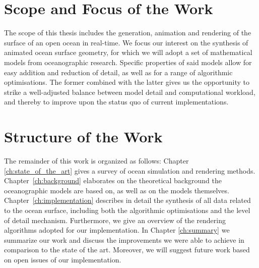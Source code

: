 \section{Scope and Focus of the Work}
\label{sec:scope_and_focus}
The scope of this thesis includes the generation, animation and rendering of the
surface of an open ocean in real-time. We focus our interest on the synthesis of
animated ocean surface geometry, for which we will adopt a set of mathematical
models from oceanographic research. Specific properties of said models allow for
easy addition and reduction of detail, as well as for a range of algorithmic
optimisations. The former combined with the latter gives us the opportunity to
strike a well-adjusted balance between model detail and computational workload,
and thereby to improve upon the status quo of current implementations.


\section{Structure of the Work}
\label{sec:structure}
The remainder of this work is organized as follows: Chapter
\ref{ch:state_of_the_art} gives a survey of ocean simulation and rendering
methods. Chapter~\ref{ch:background} elaborates on the theoretical background
the oceanographic models are based on, as well as on the models themselves.
Chapter~\ref{ch:implementation} describes in detail the
synthesis of all data related to the ocean surface, including both the algorithmic
optimisations and the level of detail mechanism. Furthermore, we give an overview
of the rendering algorithms adopted for our implementation. In Chapter
\ref{ch:summary} we summarize our work and discuss the improvements we were able
to achieve in comparison to the state of the art. Moreover, we will suggest
future work based on open issues of our implementation.